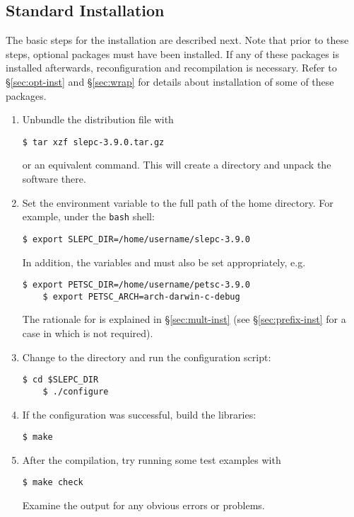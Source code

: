 \subsection{Standard Installation}
\label{sec:std-inst}

	The basic steps for the installation are described next. Note that prior to these steps, optional packages must have been installed. If any of these packages is installed afterwards, reconfiguration and recompilation is necessary. Refer to \S\ref{sec:opt-inst} and \S\ref{sec:wrap} for details about installation of some of these packages.

\begin{enumerate}
	\item Unbundle the distribution file with
	\begin{Verbatim}[fontsize=\small]
	$ tar xzf slepc-3.9.0.tar.gz
	\end{Verbatim}
        or an equivalent command. This will create a directory and unpack the software there.
	\item Set the environment variable  to the full path of the \slepc home directory. For example, under the \texttt{bash} shell:
	\begin{Verbatim}[fontsize=\small]
	$ export SLEPC_DIR=/home/username/slepc-3.9.0
	\end{Verbatim}
	In addition, the variables  and  must also be set appropriately, e.g.
	\begin{Verbatim}[fontsize=\small]
	$ export PETSC_DIR=/home/username/petsc-3.9.0
	$ export PETSC_ARCH=arch-darwin-c-debug
	\end{Verbatim}
        The rationale for  is explained in \S\ref{sec:mult-inst} (see \S\ref{sec:prefix-inst} for a case in which  is not required).
	\item\label{step-config} Change to the \slepc directory and run the configuration script:
	\begin{Verbatim}[fontsize=\small]
	$ cd $SLEPC_DIR
	$ ./configure
	\end{Verbatim}
	\item If the configuration was successful, build the libraries:
	\begin{Verbatim}[fontsize=\small]
	$ make
	\end{Verbatim}
	\item After the compilation, try running some test examples with
	\begin{Verbatim}[fontsize=\small]
	$ make check
	\end{Verbatim}
        Examine the output for any obvious errors or problems.
\end{enumerate}
	
